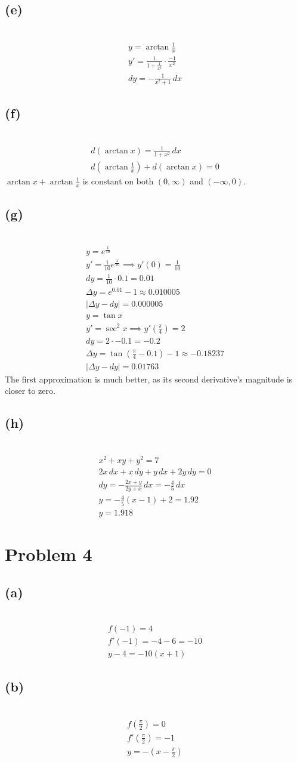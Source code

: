 \documentclass[12pt]{article}
\newcommand{\vem}{\vspace{0.5em}}
\newcommand{\problem}[1]{\section{Problem #1}}
\newcommand{\subproblem}[1]{\subsection{(#1)} \,}
\begin{document}
\subproblem{e}
\begin{gather*}
    y=\arctan \frac{1}{x}\\
    y'=\frac{1}{1+\frac{1}{x^2}} \cdot \frac{-1}{x^2}\\
    dy=\boxed{-\frac{1}{x^2+1}\, dx}
\end{gather*}

\subproblem{f}
\begin{gather*}
    d(\arctan x)=\frac{1}{1+x^2}\, dx\\
    d(\arctan \frac{1}{x})+d(\arctan x)=0
\end{gather*}
$\arctan x+\arctan \frac{1}{x}$ is constant on both $(0,\infty)$ and $(-\infty ,0)$.\vem

\subproblem{g}
\begin{gather*}
    y=e^\frac{x}{10}\\
    y'=\frac{1}{10}e^\frac{x}{10} \implies y'(0)=\frac{1}{10}\\
    dy=\frac{1}{10}\cdot 0.1=0.01\\
    \Delta y = e^{0.01}-1\approx 0.010005\\
    |\Delta y - dy|=0.000005\\
    y=\tan x\\
    y'=\sec^2 x \implies y'(\frac{\pi}{4})=2\\
    dy=2\cdot -0.1 = -0.2\\
    \Delta y = \tan (\frac{\pi}{4}-0.1) - 1\approx -0.18237\\
    |\Delta y - dy|=0.01763
\end{gather*}
The first approximation is much better, as its second derivative's magnitude is closer to zero.\vem

\subproblem{h}
\begin{gather*}
    x^2+xy+y^2=7\\
    2x\, dx + x\, dy+y\, dx+2y\, dy=0\\
    dy=-\frac{2x+y}{2y+x}\, dx = - \frac{4}{5}\, dx\\
    y=-\frac{4}{5}(x-1)+2=1.92\\
    y=1.918
\end{gather*}

\problem{4}

\subproblem{a}
\begin{gather*}
    f(-1)=4\\
    f'(-1)=-4-6=-10\\
    y-4=-10(x+1)
\end{gather*}

\subproblem{b}
\begin{gather*}
    f(\frac{\pi}{2})=0\\
    f'(\frac{\pi}{2})=-1\\
    y=-(x-\frac{\pi}{2})
\end{gather*}
\end{document}
